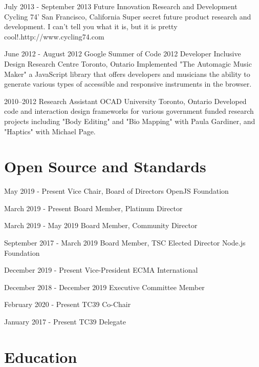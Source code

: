 \documentclass[10pt,a4paper,sans]{moderncv}   %
\begin{document}
\cventry
  {July 2013 - September 2013}
  {Future Innovation Research and Development}
  {Cycling 74'}
  {San Francisco, California}{}
  {Super secret future product research and development. I can't tell you what it is, but it is pretty cool!.\newline{}http://www.cycling74.com}

\cventry
  {June 2012 - August 2012}
  {Google Summer of Code 2012 Developer}
  {Inclusive Design Research Centre}
  {Toronto, Ontario}{}
  {Implemented "The Automagic Music Maker" a JavaScript library that offers developers and musicians the ability to generate various types of accessible and responsive instruments in the browser.}

 \cventry
   {2010--2012}
   {Research Assistant}
   {OCAD University}
   {Toronto, Ontario}{}
   {Developed code and interaction design frameworks for various government funded research projects including "Body Editing" and "Bio Mapping" with Paula Gardiner, and "Haptics" with Michael Page.}

\section{Open Source and Standards}

\cventry
  {May 2019 - Present}
  {Vice Chair, Board of Directors}
  {OpenJS Foundation}
  {}{}{}

\cventry
  {March 2019 - Present}
  {Board Member, Platinum Director}
  {}
  {}{}{}

\cventry
  {March 2019 - May 2019}
  {Board Member, Community Director}
  {}
  {}{}{}

\cventry
  {September 2017 - March 2019}
  {Board Member, TSC Elected Director}
  {Node.js Foundation}
  {}{}{}

\cventry
  {December 2019 - Present}
  {Vice-President}
  {ECMA International}
  {}{}{}

\cventry
  {December 2018 - December 2019}
  {Executive Committee Member}
  {}
  {}{}{}

\cventry
  {February 2020 - Present}
  {TC39 Co-Chair}
  {}
  {}{}{}

\cventry
  {January 2017 - Present}
  {TC39 Delegate}
  {}
  {}{}{}

\section{Education}
\end{document}
